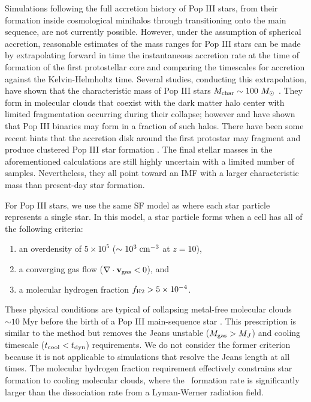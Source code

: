 \documentclass[12pt,preprint]{aastex}
\begin{document}
Simulations following the full accretion history of Pop III stars,
from their formation inside cosmological minihalos through
transitioning onto the main sequence, are not currently possible.
However, under the assumption of spherical accretion, reasonable
estimates of the mass ranges for Pop III stars can be made by
extrapolating forward in time the instantaneous accretion rate at the
time of formation of the first protostellar core and comparing the
timescales for accretion against the Kelvin-Helmholtz time.  Several
studies, conducting this extrapolation, have shown that the
characteristic mass of Pop III stars $M_{\rm char} \sim 100~\Ms$
\citep{ABN02, Bromm02_P3, OShea07a, Yoshida08}.  They form in
molecular clouds that coexist with the dark matter halo center with
limited fragmentation occurring during their collapse; however
\citet{2009Sci...325..601T} and \citet{Stacy10_Binary} have shown that
Pop III binaries may form in a fraction of such halos.  There have
been some recent hints that the accretion disk around the first
protostar may fragment and produce clustered Pop III star formation
\citep{Clark11_Frag, Greif11_P3Cluster}.  The final stellar masses in
the aforementioned calculations are still highly uncertain with a
limited number of samples.  Nevertheless, they all point toward an IMF
with a larger characteristic mass than present-day star formation.


For Pop III stars, we use the same SF model as \citet{Wise08_Gal}
where each star particle represents a single star.  In this model, a
star particle forms when a cell has all of the following criteria:
%
\begin{enumerate}
\item an overdensity of $5 \times 10^5$ ($\sim 10^3\; \cubecm$ at
  $z=10$),
\item a converging gas flow ($\nabla \cdot \mathbf{v}_{\rm gas} < 0$),
  and
\item a molecular hydrogen fraction $f_{\rm H2} > 5 \times 10^{-4}$.
\end{enumerate}
%
These physical conditions are typical of collapsing metal-free
molecular clouds $\sim 10$ Myr before the birth of a Pop III
main-sequence star \citep{ABN02, OShea07a}.  This prescription is
similar to the \citet{Cen92} method but removes the Jeans unstable
($M_{\rm gas} > M_J$) and cooling timescale ($t_{\rm cool} < t_{\rm
  dyn}$) requirements.  We do not consider the former criterion
because it is not applicable to simulations that resolve the Jeans
length at all times.  The molecular hydrogen fraction requirement
effectively constrains star formation to cooling molecular clouds,
where the \hh~formation rate is significantly larger than the
dissociation rate from a Lyman-Werner radiation field.
\end{document}

